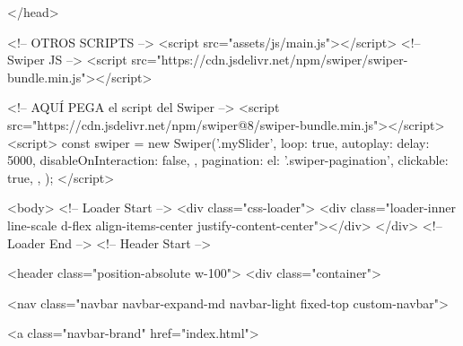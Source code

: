 </head>

<!-- OTROS SCRIPTS -->
<script src="assets/js/main.js"></script>
<!-- Swiper JS -->
<script src="https://cdn.jsdelivr.net/npm/swiper/swiper-bundle.min.js"></script>


<!-- AQUÍ PEGA el script del Swiper -->
<script src="https://cdn.jsdelivr.net/npm/swiper@8/swiper-bundle.min.js"></script>
<script>
  const swiper = new Swiper('.mySlider', {
    loop: true,
    autoplay: {
      delay: 5000,
      disableOnInteraction: false,
    },
    pagination: {
      el: '.swiper-pagination',
      clickable: true,
    },
  });
</script>

<body>
    <!-- Loader Start -->
    <div class="css-loader">
        <div class="loader-inner line-scale d-flex align-items-center justify-content-center"></div>
    </div>
    <!-- Loader End -->
    <!-- Header Start -->


        <header class="position-absolute w-100">
        <div class="container">
            

            <nav class="navbar navbar-expand-md navbar-light fixed-top custom-navbar">

                <a class="navbar-brand" href="index.html">
                    

